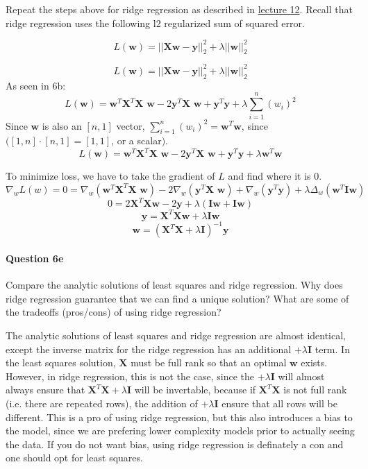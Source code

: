 \documentclass[11pt]{article}
\begin{document}
Repeat the steps above for ridge regression as described in
\href{http://www.ds100.org/fa18/syllabus\#lecture-week-6}{lecture 12}.
Recall that ridge regression uses the following l2 regularized sum of
squared error.

\[L(\textbf{w}) = ||\textbf{X}\textbf{w} - \textbf{y}||_2^2 + \lambda ||\textbf{w}||_2^2\]

    \[L(\textbf{w}) = ||\textbf{X}\textbf{w} - \textbf{y}||_2^2 + \lambda ||\textbf{w}||_2^2\]
As seen in 6b:
\[L(\textbf{w}) = \textbf{w}^T \textbf{X}^T \textbf{X w} - 2 \textbf{y}^T \textbf{X w} + \textbf{y}^T \textbf{y}+\lambda \sum^n_{i=1}(w_i)^2\]
Since \(\textbf{w}\) is also an \([n,1]\) vector,
\(\sum^n_{i=1}(w_i)^2 = \textbf{w}^T\textbf{w}\), since
\(([1,n] \cdot [n,1] = [1, 1]\), or a scalar\()\).
\[L(\textbf{w}) = \textbf{w}^T \textbf{X}^T \textbf{X w} - 2 \textbf{y}^T \textbf{X w} + \textbf{y}^T \textbf{y}+\lambda \textbf{w}^T\textbf{w}\]

To minimize loss, we have to take the gradient of \(L\) and find where
it is \(0\).
\[\nabla_w L(w)=0=\nabla_w(\textbf{w}^T \textbf{X}^T \textbf{X w}) - 2\nabla_w(\textbf{y}^T \textbf{X w}) + \nabla_w(\textbf{y}^T \textbf{y})+\lambda \Delta_w(\textbf{w}^T\textbf{I}\textbf{w})\]
\[0= 2\textbf{X}^T\textbf{Xw} - 2\textbf{y}+\lambda(\textbf{Iw} + \textbf{Iw})\]
\[ \textbf{y}= \textbf{X}^T\textbf{Xw}+\lambda\textbf{Iw}\]
\[\textbf{w} = (\textbf{X}^T\textbf{X}+\lambda\textbf{I})^{-1}\textbf{y}\]

    \paragraph{Question 6e}\label{question-6e}

Compare the analytic solutions of least squares and ridge regression.
Why does ridge regression guarantee that we can find a unique solution?
What are some of the tradeoffs (pros/cons) of using ridge regression?

    The analytic solutions of least squares and ridge regression are almost
identical, except the inverse matrix for the ridge regression has an
additional \(+\lambda\textbf{I}\) term. In the least squares solution,
\(\textbf{X}\) must be full rank so that an optimal \(\textbf{w}\)
exists. However, in ridge regression, this is not the case, since the
\(+\lambda\textbf{I}\) will almost always ensure that
\(\textbf{X}^T\textbf{X}+\lambda\textbf{I}\) will be invertable, because
if \(\textbf{X}^T\textbf{X}\) is not full rank (i.e. there are repeated
rows), the addition of \(+\lambda\textbf{I}\) ensure that all rows will
be different. This is a pro of using ridge regression, but this also
introduces a bias to the model, since we are prefering lower complexity
models prior to actually seeing the data. If you do not want bias, using
ridge regression is definately a con and one should opt for least
squares.
\end{document}
